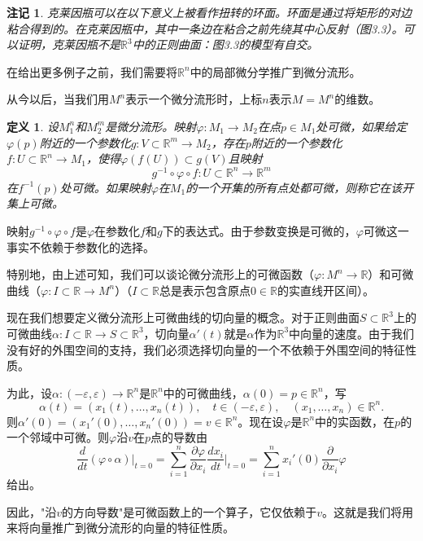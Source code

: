 \documentclass[12pt,a4paper]{ctexbook}
\newtheorem{definition}[theorem]{定义}
\newtheorem{remark}[theorem]{注记}
\begin{document}
\begin{remark}
克莱因瓶可以在以下意义上被看作扭转的环面。环面是通过将矩形的对边粘合得到的。在克莱因瓶中，其中一条边在粘合之前先绕其中心反射（图3.3）。可以证明，克莱因瓶不是$\mathbb{R}^3$中的正则曲面：图3.3的模型有自交。
\end{remark}

在给出更多例子之前，我们需要将$\mathbb{R}^n$中的局部微分学推广到微分流形。

从今以后，当我们用$M^n$表示一个微分流形时，上标$n$表示$M=M^n$的维数。

\begin{definition}
设$M_1^n$和$M_2^m$是微分流形。映射$\varphi:M_1\to M_2$在点$p\in M_1$处可微，如果给定$\varphi(p)$附近的一个参数化$g:V\subset\mathbb{R}^m\to M_2$，存在$p$附近的一个参数化$f:U\subset\mathbb{R}^n\to M_1$，使得$\varphi(f(U))\subset g(V)$且映射
$$g^{-1}\circ\varphi\circ f: U\subset\mathbb{R}^n\to\mathbb{R}^m$$
在$f^{-1}(p)$处可微。如果映射$\varphi$在$M_1$的一个开集的所有点处都可微，则称它在该开集上可微。
\end{definition}

映射$g^{-1}\circ\varphi\circ f$是$\varphi$在参数化$f$和$g$下的表达式。由于参数变换是可微的，$\varphi$可微这一事实不依赖于参数化的选择。

特别地，由上述可知，我们可以谈论微分流形上的可微函数（$\varphi:M^n\to\mathbb{R}$）和可微曲线（$\varphi:I\subset\mathbb{R}\to M^n$）（$I\subset\mathbb{R}$总是表示包含原点$0\in\mathbb{R}$的实直线开区间）。

现在我们想要定义微分流形上可微曲线的切向量的概念。对于正则曲面$S\subset\mathbb{R}^3$上的可微曲线$\alpha:I\subset\mathbb{R}\to S\subset\mathbb{R}^3$，切向量$\alpha'(t)$就是$\alpha$作为$\mathbb{R}^3$中向量的速度。由于我们没有好的外围空间的支持，我们必须选择切向量的一个不依赖于外围空间的特征性质。

为此，设$\alpha:(-\varepsilon,\varepsilon)\to\mathbb{R}^n$是$\mathbb{R}^n$中的可微曲线，$\alpha(0)=p\in\mathbb{R}^n$，写
$$\alpha(t) = (x_1(t),\ldots,x_n(t)),\quad t\in(-\varepsilon,\varepsilon),\quad (x_1,\ldots,x_n)\in\mathbb{R}^n.$$
则$\alpha'(0) = (x_1'(0),\ldots,x_n'(0)) = v\in\mathbb{R}^n$。现在设$\varphi$是$\mathbb{R}^n$中的实函数，在$p$的一个邻域中可微。则$\varphi$沿$v$在$p$点的导数由
$$\frac{d}{dt}(\varphi\circ\alpha)\big|_{t=0} = \sum_{i=1}^n \frac{\partial\varphi}{\partial x_i}\frac{dx_i}{dt}\bigg|_{t=0} = \sum_{i=1}^n x_i'(0)\frac{\partial}{\partial x_i}\varphi$$
给出。

因此，"沿$v$的方向导数"是可微函数上的一个算子，它仅依赖于$v$。这就是我们将用来将向量推广到微分流形的向量的特征性质。
\end{document}
